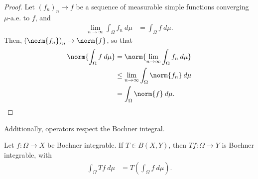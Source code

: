 \documentclass[10pt]{mypackage}
\begin{document}
\begin{proof}
  Let $\left( f_n \right)_n\rightarrow f$ be a sequence of measurable simple functions converging $\mu$-a.e. to $f$, and
  \begin{align*}
    \lim_{n\rightarrow\infty} \int_{\Omega}^{} f_n\:d\mu &= \int_{\Omega}^{} f\:d\mu.
  \end{align*}
  Then, $\left( \norm{f_n} \right)_n\rightarrow \norm{f}$, so that
  \begin{align*}
    \norm{ \int_{\Omega}^{} f\:d\mu } &= \norm{\lim_{n\rightarrow\infty} \int_{\Omega}^{} f_n\:d\mu}\\
                                      &\leq \lim_{n\rightarrow\infty} \int_{\Omega}^{} \norm{f_n}\:d\mu\\
                                      &= \int_{\Omega}^{} \norm{f}\:d\mu.
  \end{align*}
\end{proof}
Additionally, operators respect the Bochner integral.
\begin{proposition}
  Let $f\colon \Omega\rightarrow X$ be Bochner integrable. If $T\in B\left( X,Y \right)$, then $Tf\colon \Omega\rightarrow Y$ is Bochner integrable, with
  \begin{align*}
    \int_{\Omega}^{} Tf\:d\mu &= T\left( \int_{\Omega}^{} f\:d\mu \right).
  \end{align*}
\end{proposition}
\nocite{ryan_tensor_products_banach_spaces,williams_crossed_products_cstar_algebras}
\printbibliography
\end{document}
